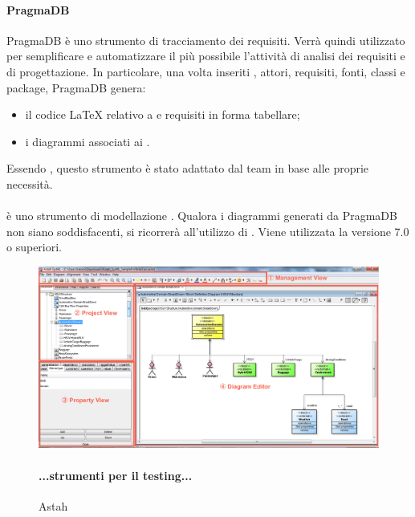  \paragraph{PragmaDB} 
  PragmaDB è uno strumento  di tracciamento dei requisiti. Verrà quindi utilizzato per semplificare e automatizzare il più possibile l'attività di analisi dei requisiti e di progettazione. In particolare, una volta inseriti , attori, requisiti, fonti, classi e package, PragmaDB genera: 
  \begin{itemize}
  \item il codice \LaTeX{} relativo a  e requisiti in forma tabellare;
  \item i diagrammi  associati ai .
  
  \end{itemize}
  Essendo , questo strumento è stato adattato dal team \GRUPPO{} in base alle proprie necessità.
  \paragraph{}
   è uno strumento di modellazione . Qualora i diagrammi  generati da PragmaDB non siano soddisfacenti, si ricorrerà all'utilizzo di . Viene utilizzata la versione 7.0 o superiori.
\begin{figure}[h]
\centering
\includegraphics[scale=0.3]{img/astah.png}
\caption{Astah}\label{sec:Figura1}
\paragraph{...strumenti per il testing...}
\end{figure}

\newpage


  
